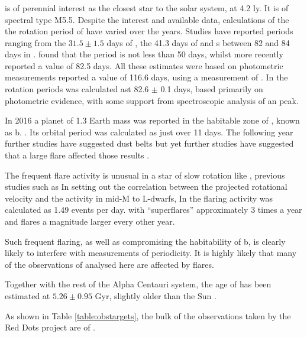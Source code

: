 \subsubsection{\prox}
{\prox} is of perennial interest as the closest star to the solar system, at 4.2 ly. It is of spectral type M5.5.
Despite the interest and available data, calculations of the the rotation period
of {\prox} have varied over the years.  Studies have reported periods
ranging from the $ 31.5 \pm 1.5 $ days of \citet{guinan96}, the 41.3 days of \citet{benedict93}
and s between 82 and 84 days in \citealt{benedict92,benedict98}.  \citet{kurster99} found that the period is not less
than 50 days, whilst more recently \citet{kiraga07} reported a value of 82.5
days. All these estimates were based on photometric measurements \citet[Table 3]{suarezmascareno15} reported a value of 116.6 days, using a
measurement of {\ha}. In \citet{collins17} the rotation periods was calculated
ast 82.6 $\pm$ 0.1 days, based primarily on photometric evidence, with some
support from spectroscopic analysis of an {\ha} peak.

In 2016 a planet of 1.3 Earth mass was reported in the habitable
zone of \prox, known as {\prox} b. \citep{angladaescude16}. Its orbital period was calculated as just over 11
days. The following year further studies have suggested dust belts \citep{anglada17} but yet further
studies have suggested that a large flare affected those results \citep{macgregor18}.

The frequent flare activity is unusual in a star of slow rotation like \prox,
previous studies such as In \citet{mohanty03} setting out the correlation
between the projected rotational velocity {\vsini} and the
activity in mid-M to L-dwarfs, In \citet{vida19} the flaring activity was
calculated as 1.49 events per day. with ``superflares'' approximately 3 times a
year and flares a magnitude larger every other year.

Such frequent flaring, as well as compromising the habitability of {\prox} b,
is clearly likely to interfere with measurements of periodicity. It is highly
likely that many of the observations of {\prox} analysed here are affected by
flares.

Together with the rest of the Alpha Centauri system, the age of {\prox} has been
estimated at $5.26 \pm 0.95$ Gyr, slightly older than the Sun \citep{joyce18}.

As shown in Table \ref{table:obstargets}, the bulk of the observations taken
by the Red Dots project are of \prox.

